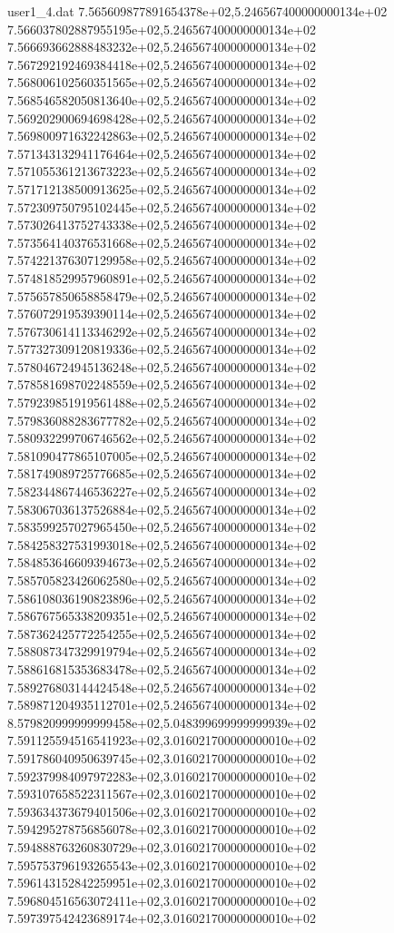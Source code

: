 \begin{filecontents}{user1_4.dat}
7.565609877891654378e+02,5.246567400000000134e+02
7.566037802887955195e+02,5.246567400000000134e+02
7.566693662888483232e+02,5.246567400000000134e+02
7.567292192469384418e+02,5.246567400000000134e+02
7.568006102560351565e+02,5.246567400000000134e+02
7.568546582050813640e+02,5.246567400000000134e+02
7.569202900694698428e+02,5.246567400000000134e+02
7.569800971632242863e+02,5.246567400000000134e+02
7.571343132941176464e+02,5.246567400000000134e+02
7.571055361213673223e+02,5.246567400000000134e+02
7.571712138500913625e+02,5.246567400000000134e+02
7.572309750795102445e+02,5.246567400000000134e+02
7.573026413752743338e+02,5.246567400000000134e+02
7.573564140376531668e+02,5.246567400000000134e+02
7.574221376307129958e+02,5.246567400000000134e+02
7.574818529957960891e+02,5.246567400000000134e+02
7.575657850658858479e+02,5.246567400000000134e+02
7.576072919539390114e+02,5.246567400000000134e+02
7.576730614113346292e+02,5.246567400000000134e+02
7.577327309120819336e+02,5.246567400000000134e+02
7.578046724945136248e+02,5.246567400000000134e+02
7.578581698702248559e+02,5.246567400000000134e+02
7.579239851919561488e+02,5.246567400000000134e+02
7.579836088283677782e+02,5.246567400000000134e+02
7.580932299706746562e+02,5.246567400000000134e+02
7.581090477865107005e+02,5.246567400000000134e+02
7.581749089725776685e+02,5.246567400000000134e+02
7.582344867446536227e+02,5.246567400000000134e+02
7.583067036137526884e+02,5.246567400000000134e+02
7.583599257027965450e+02,5.246567400000000134e+02
7.584258327531993018e+02,5.246567400000000134e+02
7.584853646609394673e+02,5.246567400000000134e+02
7.585705823426062580e+02,5.246567400000000134e+02
7.586108036190823896e+02,5.246567400000000134e+02
7.586767565338209351e+02,5.246567400000000134e+02
7.587362425772254255e+02,5.246567400000000134e+02
7.588087347329919794e+02,5.246567400000000134e+02
7.588616815353683478e+02,5.246567400000000134e+02
7.589276803144424548e+02,5.246567400000000134e+02
7.589871204935112701e+02,5.246567400000000134e+02
8.579820999999999458e+02,5.048399699999999939e+02
7.591125594516541923e+02,3.016021700000000010e+02
7.591786040950639745e+02,3.016021700000000010e+02
7.592379984097972283e+02,3.016021700000000010e+02
7.593107658522311567e+02,3.016021700000000010e+02
7.593634373679401506e+02,3.016021700000000010e+02
7.594295278756856078e+02,3.016021700000000010e+02
7.594888763260830729e+02,3.016021700000000010e+02
7.595753796193265543e+02,3.016021700000000010e+02
7.596143152842259951e+02,3.016021700000000010e+02
7.596804516563072411e+02,3.016021700000000010e+02
7.597397542423689174e+02,3.016021700000000010e+02

\end{filecontents}
